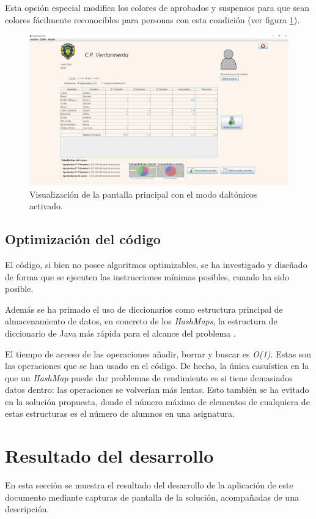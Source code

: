 Esta opción especial modifica los colores de aprobados y suspensos para que sean colores fácilmente reconocibles para personas con esta condición (ver figura \ref{Fig:appdaltonicos}).

\begin{figure}[h]
\centering\includegraphics[width=1\linewidth]{figs/appdaltonicos.png}
\caption{Visualización de la pantalla principal con el modo daltónicos activado.}
\label{Fig:appdaltonicos}
\end{figure}

\subsection{Optimización del código}
\label{sub:optimizarcodigo}
El código, si bien no posee algoritmos optimizables, se ha investigado y diseñado de forma que se ejecuten las instrucciones mínimas posibles, cuando ha sido posible.

Además se ha primado el uso de diccionarios como estructura principal de almacenamiento de datos, en concreto de los \textit{HashMaps}, la estructura de diccionario de Java más rápida para el alcance del problema \cite{hashmap}.

El tiempo de acceso de las operaciones añadir, borrar y buscar es \textit{O(1)}. Estas son las operaciones que se han usado en el código. De hecho, la única casuística en la que un \textit{HashMap} puede dar problemas de rendimiento es si tiene demasiados datos dentro: las operaciones se volverían más lentas. Esto también se ha evitado en la solución propuesta, donde el número máximo de elementos de cualquiera de estas estructuras es el número de alumnos en una asignatura.

\section{Resultado del desarrollo}
En esta sección se muestra el resultado del desarrollo de la aplicación de este documento mediante capturas de pantalla de la solución, acompañadas de una descripción.

